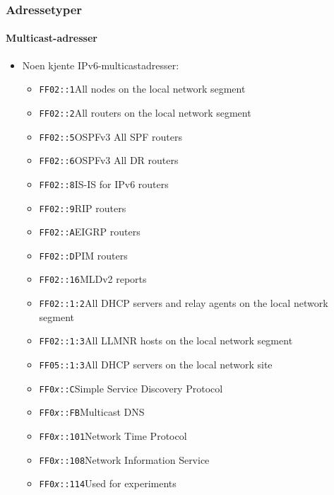 \begin{frame}%
  \frametitle{Adressetyper}
  \framesubtitle{Multicast-adresser}
  \begin{itemize}[<+->]
  \item Noen kjente IPv6-multicastadresser:
    \begin{itemize}[<+->]
    \item \texttt{FF02::1}\quad All nodes on the local network segment
    \item \texttt{FF02::2}\quad All routers on the local network segment
    \item \texttt{FF02::5}\quad OSPFv3 All SPF routers
    \item \texttt{FF02::6}\quad OSPFv3 All DR routers
    \item \texttt{FF02::8}\quad IS-IS for IPv6 routers
    \item \texttt{FF02::9}\quad RIP routers
    \item \texttt{FF02::A}\quad EIGRP routers
    \item \texttt{FF02::D}\quad PIM routers
    \item \texttt{FF02::16}\quad MLDv2 reports
    \item \texttt{FF02::1:2}\quad All DHCP servers and relay agents on the local network segment
    \item \texttt{FF02::1:3}\quad All LLMNR hosts on the local network segment
    \item \texttt{FF05::1:3}\quad All DHCP servers on the local network site
    \item \texttt{FF0\textit{x}::C}\quad Simple Service Discovery Protocol
    \item \texttt{FF0\textit{x}::FB}\quad Multicast DNS
    \item \texttt{FF0\textit{x}::101}\quad Network Time Protocol
    \item \texttt{FF0\textit{x}::108}\quad Network Information Service
    \item \texttt{FF0\textit{x}::114}\quad Used for experiments
    \end{itemize}
  \end{itemize}
\end{frame}

